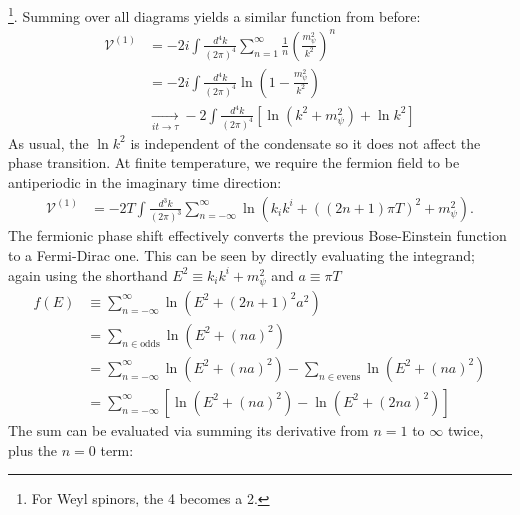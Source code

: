 \documentclass[%
 reprint,
nofootinbib,
 amsmath,amssymb,
 aps,
floatfix,
]{revtex4-1}
\DeclareMathOperator{\V}{\mathcal{V}}
\newcommand\underrel[2]{\mathrel{\mathop{#2}\limits_{#1}}}
\begin{document}
\footnote{For Weyl spinors, the 4 becomes a 2.}.
Summing over all diagrams yields a similar function from before:
\begin{align}
    \V^{(1)} &= -2i \int \frac{d^4k}{(2\pi)^4} \sum_{n=1}^{\infty} \frac{1}{n}\left(\frac{m_\psi^2}{k^2}\right)^n \\
    &= -2i \int \frac{d^4k}{(2\pi)^4} \ln \left(1-\frac{m_\psi^2}{k^2}\right) \\
    &\underrel{it\rightarrow \tau}{\rightarrow} -2 \int \frac{d^4k}{(2\pi)^4} \left[\ln \left(k^2 + m_\psi^2\right) + \ln k^2 \right]
\end{align}
As usual, the $\ln k^2$ is independent of the condensate so it does not affect the phase transition. At finite temperature, we require the fermion field to be antiperiodic in the imaginary time direction:
\begin{align}
    \V^{(1)} &= -2T \int \frac{d^3k}{(2\pi)^3} \sum_{n=-\infty}^{\infty} \ln \left(k_ik^i+ \left((2n+1)\pi T\right)^2 +m_\psi^2\right).
\end{align}
The fermionic phase shift effectively converts the previous Bose-Einstein function to a Fermi-Dirac one.
This can be seen by directly evaluating the integrand; again using the shorthand $E^2 \equiv k_ik^i + m_\psi^2$ and $a\equiv \pi T$
\begin{equation}
\begin{split}
    f(E) &\equiv \sum_{n=-\infty}^{\infty} \ln \left(E^2 + (2n+1)^2a^2\right) \\
    &= \sum_{n\in \text{odds}} \ln \left(E^2 + (na)^2\right) \\
    &= \sum_{n=-\infty}^{\infty} \ln \left(E^2 + (na)^2\right) - \sum_{n\in \text{evens}} \ln \left(E^2 + (na)^2\right) \\
    &= \sum_{n=-\infty}^{\infty} \left[\ln \left(E^2 + (na)^2\right) - \ln \left(E^2 + (2na)^2\right)\right]
\end{split}
\end{equation}
The sum can be evaluated via summing its derivative from $n=1$ to $\infty$ twice, plus the $n=0$ term:
\end{document}
